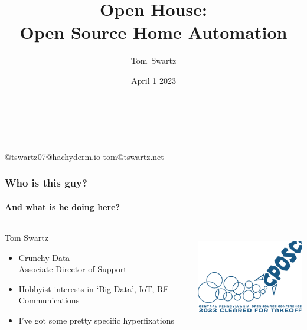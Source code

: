 \documentclass[aspectratio=169]{beamer}
\title{Open House: \\ Open Source Home Automation}
\author[Swartz]{Tom~Swartz}
\institute{Central PA Open Source Conference}
\date{April 1 2023}
\begin{document}
{
\begin{frame}[plain]
    \begin{TitleBox}
        \begin{center}
            {\color{red}\Large\inserttitle\color{black}}\\
        \end{center}
        \insertauthor{}\hfill\textbf{\insertinstitute{}}\hfill\insertdate{}\\
        {\footnotesize
        \href{https://hachyderm.io/@tswartz07}{@tswartz07@hachyderm.io}
        \hfill
        \href{mailto: tom@tswartz.net}{tom@tswartz.net}
        }
    \end{TitleBox}
    \vspace{15em}
\end{frame}}

\begin{frame}
  \frametitle{Who is this guy?}
  \framesubtitle{And what is he doing here?}
  \begin{columns}[]
    \begin{column}[T]{0.45\paperwidth}
      {\huge Tom Swartz}
      \vfill
      \begin{itemize}[<+->]
        \item{Crunchy Data \\ Associate Director of Support}
        \item{Hobbyist interests in `Big Data', IoT, RF Communications}
        \item{I've got some pretty specific hyperfixations}
      \end{itemize}
    \end{column}
    \begin{column}[T]{0.45\paperwidth}
      \includegraphics[height=4cm,keepaspectratio]{images/logo.png}
    \end{column}
  \end{columns}
\end{frame}
\end{document}
